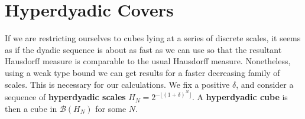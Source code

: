 \section{Hyperdyadic Covers}

If we are restricting ourselves to cubes lying at a series of discrete scales, it seems as if the dyadic sequence is about as fast as we can use so that the resultant Hausdorff measure is comparable to the usual Hausdorff measure. Nonetheless, using a weak type bound we can get results for a faster decreasing family of scales. This is necessary for our calculations. We fix a positive $\delta$, and consider a sequence of {\bf hyperdyadic scales} $H_N = 2^{- \lfloor (1 + \delta)^N \rfloor}$. A {\bf hyperdyadic cube} is then a cube in $\mathcal{B}(H_N)$ for some $N$.


